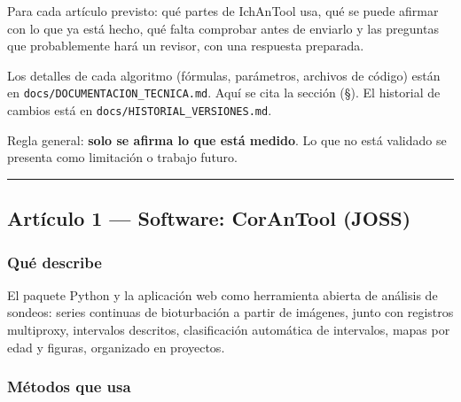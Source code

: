 \documentclass[
  10pt,
]{article}
\begin{document}
Para cada artículo previsto: qué partes de IchAnTool usa, qué se puede
afirmar con lo que ya está hecho, qué falta comprobar antes de enviarlo
y las preguntas que probablemente hará un revisor, con una respuesta
preparada.

Los detalles de cada algoritmo (fórmulas, parámetros, archivos de
código) están en \texttt{docs/DOCUMENTACION\_TECNICA.md}. Aquí se cita
la sección (§). El historial de cambios está en
\texttt{docs/HISTORIAL\_VERSIONES.md}.

Regla general: \textbf{solo se afirma lo que está medido}. Lo que no
está validado se presenta como limitación o trabajo futuro.

\begin{center}\rule{0.5\linewidth}{0.5pt}\end{center}

\hypertarget{artuxedculo-1-software-corantool-joss}{%
\subsection{Artículo 1 --- Software: CorAnTool
(JOSS)}\label{artuxedculo-1-software-corantool-joss}}

\hypertarget{quuxe9-describe}{%
\subsubsection{Qué describe}\label{quuxe9-describe}}

El paquete Python y la aplicación web como herramienta abierta de
análisis de sondeos: series continuas de bioturbación a partir de
imágenes, junto con registros multiproxy, intervalos descritos,
clasificación automática de intervalos, mapas por edad y figuras,
organizado en proyectos.

\hypertarget{muxe9todos-que-usa}{%
\subsubsection{Métodos que usa}\label{muxe9todos-que-usa}}
\end{document}

